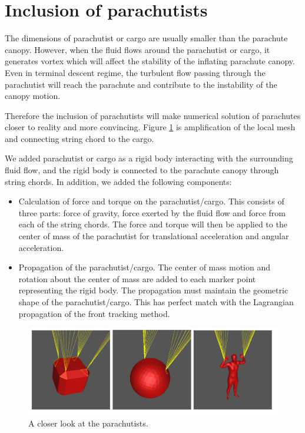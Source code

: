 \section{Inclusion of parachutists} 
The dimensions of parachutist or cargo are usually smaller than the parachute
canopy. However, when the fluid flows around the parachutist or cargo, it
generates vortex which will affect the stability of the inflating parachute
canopy.  Even in terminal descent regime, the turbulent flow passing through
the parachutist will reach the parachute and contribute to the instability of
the canopy motion.

Therefore the inclusion of parachutists will make numerical solution of
parachutes closer to reality and more convincing.  Figure \ref{fig:init_closer}
is amplification of the local mesh and connecting string chord to the cargo.

We added parachutist or cargo as a rigid body interacting with the surrounding
fluid flow, and the rigid body is connected to the parachute canopy through
string chords. In addition, we added the following components:

\begin{itemize}
\item Calculation of force and torque on the parachutist/cargo. This consists
of three parts: force of gravity, force exerted by the fluid flow and force
from each of the string chords. The force and torque will then be applied to
the center of mass of the parachutist for translational acceleration and
angular acceleration.

\item Propagation of the parachutist/cargo. The center
of mass motion and rotation about the center of mass are added to each marker
point representing the rigid body. The propagation must maintain the geometric
shape of the parachutist/cargo. This has perfect match with the Lagrangian
propagation of the front tracking method.
\end{itemize}

\begin{figure}[!ht] \centering
\includegraphics[width=6in]{Figures/parachutist-1.png} \caption{A closer look at
the parachutists.}\label{fig:init_closer} \end{figure}

